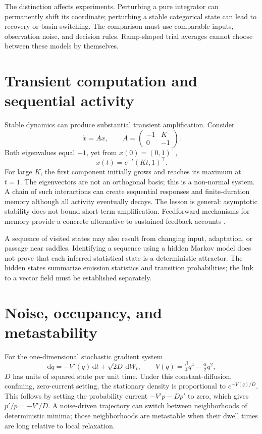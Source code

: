The distinction affects experiments. Perturbing a pure integrator can permanently shift its coordinate; perturbing a stable categorical state can lead to recovery or basin switching. The comparison must use comparable inputs, observation noise, and decision rules. Ramp-shaped trial averages cannot choose between these models by themselves.

\section{Transient computation and sequential activity}
Stable dynamics can produce substantial transient amplification. Consider
\begin{equation}
 \dot x=Ax,\qquad A=\begin{pmatrix}-1&K\\0&-1\end{pmatrix}.
\end{equation}
Both eigenvalues equal $-1$, yet from $x(0)=(0,1)^\top$,
\[
 x(t)=e^{-t}(Kt,1)^\top.
\]
For large $K$, the first component initially grows and reaches its maximum at $t=1$. The eigenvectors are not an orthogonal basis; this is a non-normal system. A chain of such interactions can create sequential responses and finite-duration memory although all activity eventually decays. The lesson is general: asymptotic stability does not bound short-term amplification. Feedforward mechanisms for memory provide a concrete alternative to sustained-feedback accounts \citep{app_goldman2009}.

A sequence of visited states may also result from changing input, adaptation, or passage near saddles. Identifying a sequence using a hidden Markov model does not prove that each inferred statistical state is a deterministic attractor. The hidden states summarize emission statistics and transition probabilities; the link to a vector field must be established separately.

\section{Noise, occupancy, and metastability}
For the one-dimensional stochastic gradient system
\begin{equation}
 \mathrm dq=-V'(q)\,\mathrm dt+\sqrt{2D}\,\mathrm dW_t,
 \qquad V(q)=\tfrac\beta4q^4-\tfrac\alpha2q^2,
\end{equation}
$D$ has units of squared state per unit time. Under this constant-diffusion, confining, zero-current setting, the stationary density is proportional to $e^{-V(q)/D}$. This follows by setting the probability current $-V'p-Dp'$ to zero, which gives $p'/p=-V'/D$. A noise-driven trajectory can switch between neighborhoods of deterministic minima; those neighborhoods are metastable when their dwell times are long relative to local relaxation.


